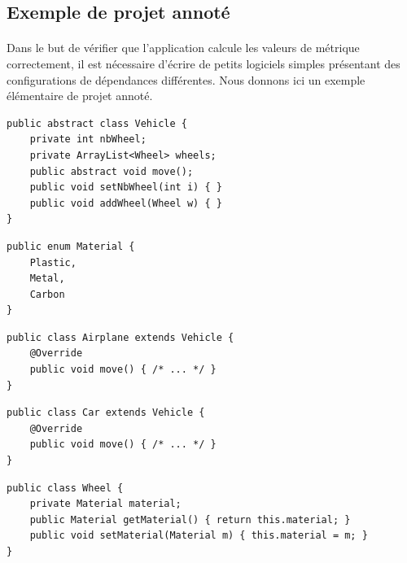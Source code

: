 \documentclass{scrartcl}
\begin{document}
\newpage
\begin{appendices}


\section{Exemple de projet annoté}
    \paragraph{}Dans le but de vérifier que l'application calcule les valeurs de métrique correctement, il est nécessaire d'écrire de petits logiciels simples présentant des configurations de dépendances différentes. Nous donnons ici un exemple élémentaire de projet annoté.

\begin{minipage}{7.5cm}
\begin{lstlisting}[caption=Classe Vehicle]
public abstract class Vehicle {
    private int nbWheel;
    private ArrayList<Wheel> wheels;
    public abstract void move();
    public void setNbWheel(int i) { }
    public void addWheel(Wheel w) { }
}
\end{lstlisting}
\end{minipage}
\hspace{0.5cm}
\begin{minipage}{6cm}
\begin{lstlisting}[caption=Enumeration Material]
public enum Material {
    Plastic,
    Metal,
    Carbon
}
\end{lstlisting}
\end{minipage}
\vspace{0.5cm}
\begin{lstlisting}[caption=Classe Airplane]
public class Airplane extends Vehicle {
    @Override
    public void move() { /* ... */ }
}
\end{lstlisting}
\begin{lstlisting}[caption=Classe Car]
public class Car extends Vehicle {
    @Override
    public void move() { /* ... */ }
}
\end{lstlisting}
\begin{lstlisting}[caption=Classe Wheel]
public class Wheel {
    private Material material;
    public Material getMaterial() { return this.material; }
    public void setMaterial(Material m) { this.material = m; }
}
\end{lstlisting}




\end{appendices}
\end{document}
